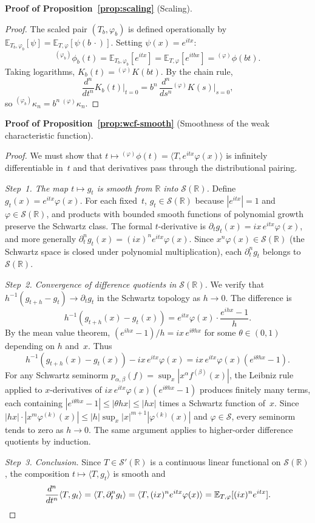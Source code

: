 \documentclass[12pt]{article}
\theoremstyle{definition}
\newcommand{\R}{\mathbb{R}}
\newcommand{\E}{\mathbb{E}}
\begin{document}
\medskip
\noindent\textbf{Proof of Proposition~\ref{prop:scaling}}
(Scaling).

\begin{proof}
The scaled pair $(T_b,\varphi_b)$ is defined operationally by
$\E_{T_b,\varphi_b}[\psi] = \E_{T,\varphi}[\psi(b\,\cdot)]$.  Setting
$\psi(x)=e^{itx}$:
\[
{}^{(\varphi_b)}\phi_b(t)
= \E_{T_b,\varphi_b}[e^{itx}]
= \E_{T,\varphi}[e^{itbx}]
= {}^{(\varphi)}\phi(bt).
\]
Taking logarithms, $K_b(t) = {}^{(\varphi)}K(bt)$.  By the chain rule,
\[
\frac{d^n}{dt^n}K_b(t)\Big|_{t=0}
= b^n\,\frac{d^n}{ds^n}{}^{(\varphi)}K(s)\Big|_{s=0},
\]
so ${}^{(\varphi_b)}\kappa_n = b^n\,{}^{(\varphi)}\kappa_n$.
\end{proof}

\medskip
\noindent\textbf{Proof of Proposition~\ref{prop:wcf-smooth}}
(Smoothness of the weak characteristic function).

\begin{proof}
We must show that $t\mapsto {}^{(\varphi)}\phi(t) = \langle T,
e^{itx}\varphi(x)\rangle$ is infinitely differentiable in~$t$ and
that derivatives pass through the distributional pairing.

\emph{Step~1.  The map $t\mapsto g_t$ is smooth from $\R$ into
$\mathcal{S}(\R)$.}
Define $g_t(x) = e^{itx}\varphi(x)$.  For each fixed~$t$,
$g_t\in\mathcal{S}(\R)$ because $|e^{itx}|=1$ and $\varphi\in
\mathcal{S}(\R)$, and products with bounded smooth functions of
polynomial growth preserve the Schwartz class.  The formal $t$-derivative
is $\partial_t g_t(x) = ix\,e^{itx}\varphi(x)$, and more generally
$\partial_t^n g_t(x) = (ix)^n e^{itx}\varphi(x)$.  Since
$x^n\varphi(x)\in\mathcal{S}(\R)$ (the Schwartz space is closed
under polynomial multiplication), each $\partial_t^n g_t$ belongs
to $\mathcal{S}(\R)$.

\emph{Step~2.  Convergence of difference quotients in
$\mathcal{S}(\R)$.}
We verify that $h^{-1}(g_{t+h}-g_t)\to \partial_t g_t$ in the
Schwartz topology as $h\to 0$.  The difference is
\[
h^{-1}(g_{t+h}(x)-g_t(x))
= e^{itx}\varphi(x)\cdot\frac{e^{ihx}-1}{h}.
\]
By the mean value theorem,
$(e^{ihx}-1)/h = ix\,e^{i\theta hx}$ for some
$\theta\in(0,1)$ depending on $h$ and~$x$.  Thus
\[
h^{-1}(g_{t+h}(x)-g_t(x)) - ix\,e^{itx}\varphi(x)
= ix\,e^{itx}\varphi(x)(e^{i\theta hx}-1).
\]
For any Schwartz seminorm
$p_{\alpha,\beta}(f)=\sup_x|x^\alpha f^{(\beta)}(x)|$, the
Leibniz rule applied to $x$-derivatives of $ix\,e^{itx}\varphi(x)
(e^{i\theta hx}-1)$ produces finitely many terms, each containing
$|e^{i\theta hx}-1|\le |\theta hx|\le |hx|$ times a Schwartz
function of~$x$.  Since $|hx|\cdot|x^m\varphi^{(k)}(x)|\le
|h|\sup_x|x|^{m+1}|\varphi^{(k)}(x)|$ and $\varphi\in\mathcal{S}$,
every seminorm tends to zero as $h\to 0$.  The same argument applies
to higher-order difference quotients by induction.

\emph{Step~3.  Conclusion.}
Since $T\in\mathcal{S}'(\R)$ is a continuous linear functional on
$\mathcal{S}(\R)$, the composition $t\mapsto\langle T,g_t\rangle$
is smooth and
\[
\frac{d^n}{dt^n}\langle T,g_t\rangle
= \langle T,\partial_t^n g_t\rangle
= \langle T,(ix)^n e^{itx}\varphi(x)\rangle
= \E_{T,\varphi}[(ix)^n e^{itx}]. \qedhere
\]
\end{proof}
\end{document}

